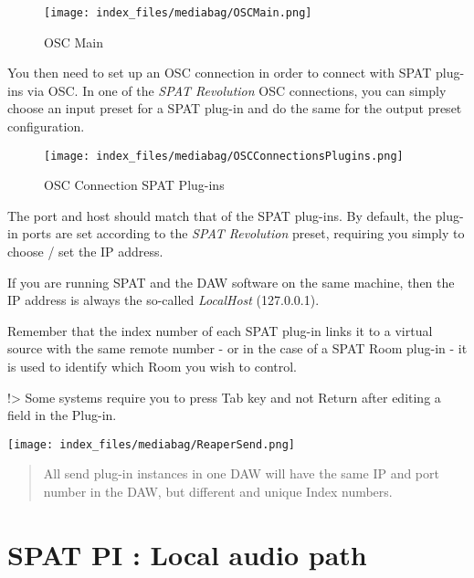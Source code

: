 \documentclass[
  letterpaper,
  DIV=11,
  numbers=noendperiod]{scrreport}
\begin{document}
\begin{figure}

{\centering \texttt{[image: index\_files/mediabag/OSCMain.png]}

}

\caption{OSC Main}

\end{figure}

You then need to set up an OSC connection in order to connect with SPAT
plug-ins via OSC. In one of the \emph{SPAT Revolution} OSC connections,
you can simply choose an input preset for a SPAT plug-in and do the same
for the output preset configuration.

\begin{figure}

{\centering \texttt{[image: index\_files/mediabag/OSCConnectionsPlugins.png]}

}

\caption{OSC Connection SPAT Plug-ins}

\end{figure}

The port and host should match that of the SPAT plug-ins. By default,
the plug-in ports are set according to the \emph{SPAT Revolution}
preset, requiring you simply to choose / set the IP address.

If you are running SPAT and the DAW software on the same machine, then
the IP address is always the so-called \emph{LocalHost} (127.0.0.1).

Remember that the index number of each SPAT plug-in links it to a
virtual source with the same remote number - or in the case of a SPAT
Room plug-in - it is used to identify which Room you wish to control.

!\textgreater{} Some systems require you to press Tab key and not Return
after editing a field in the Plug-in.

\texttt{[image: index\_files/mediabag/ReaperSend.png]}

\begin{quote}
All send plug-in instances in one DAW will have the same IP and port
number in the DAW, but different and unique Index numbers.
\end{quote}

\hypertarget{spat-pi-local-audio-path}{%
\chapter{SPAT PI : Local audio path}\label{spat-pi-local-audio-path}}
\end{document}
